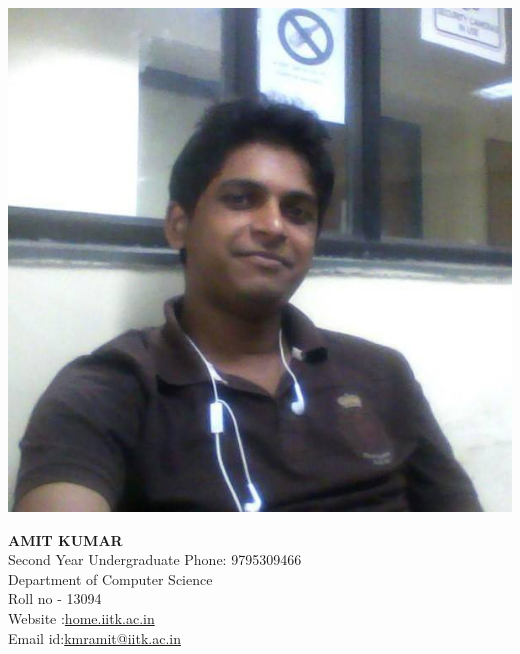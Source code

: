 \documentclass[10pt]{article}
\begin{document}
\begin{flushright}
\includegraphics[scale=0.25,bb=0 0 300 300]{myimage.jpg}
\end{flushright}
\begin{flushleft}
{\huge \textbf{AMIT KUMAR}}\\
Second Year Undergraduate \hspace{85mm}
 Phone: 9795309466\\
Department of Computer Science\\
Roll no - 13094\\
Website :\url{home.iitk.ac.in}\\
Email id:\url{kmramit@iitk.ac.in}\\
\end{flushleft}
\end{document}
